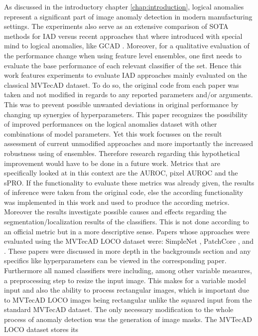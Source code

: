 As discussed in the introductory chapter \ref{chap:introduction}, logical anomalies represent a significant part of image anomaly detection in modern
manufacturing settings. The experiments also serve as an extensive comparison of SOTA methods for IAD versus recent approaches that where 
introduced with special mind to logical anomalies, like GCAD \cite{LOCODentsAndScratchesBergmann2022}. 
Moreover, for a qualitative evaluation of the performance change when using feature level ensembles, one first needs to evaluate the base performance 
of each relevant classifier of the set. 
Hence this work features experiments to evaluate IAD approaches mainly evaluated on the classical MVTecAD dataset. To do so, the original 
code from each paper was taken and not modified in regards to any reported parameters and/or arguments. This was to prevent possible unwanted deviations 
in original performance by changing up synergies of hyperparameters. This paper recognizes the possibility of improved performances on the logical anomalies dataset 
with other combinations of model parameters. Yet this work focusses on the result assessment of current unmodified approaches and 
more importantly the increased robustness using of ensembles. Therefore research regarding this hypothetical improvement would 
have to be done in a future work. Metrics that are specifically looked at in this context are the AUROC, pixel AUROC and the sPRO. 
If the functionality to evaluate these metrics was already given, the results of inference were taken from the original code, else the according functionality 
was implemented in this work and used to produce the according metrics. Moreover the results investigate possible causes and effects regarding the segmentation/localization results of the 
classifiers. This is not done according to an official metric but in a more descriptive sense.
Papers whose approaches were evaluated using the MVTecAD LOCO dataset were: SimpleNet \cite{liu2023simplenet}, PatchCore \cite{patchCore2022}, \cite{csflow2022} and \cite{Zavrtanik_2021DRAEM}. 
These papers were discussed in more depth in the backgrounds section and any specifics like 
hyperparameters can be viewed in the corresponding paper. Furthermore all named classifiers were including, among other variable measures, 
a preprocessing step to resize the input image. This makes for a variable model input and also the ability to process rectangular images, 
which is important due to MVTecAD LOCO images being rectangular unlike the squared input from the standard MVTecAD dataset. The only 
necessary modification to the whole process of anomaly detection was the generation of image masks. The MVTecAD LOCO dataset stores its 
